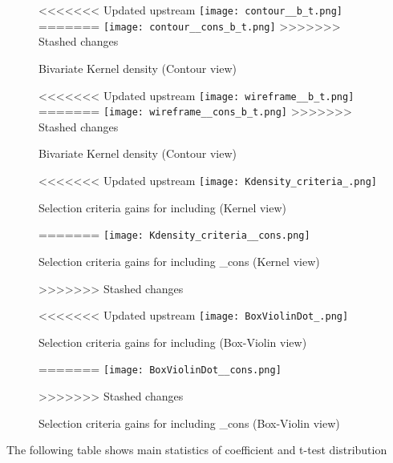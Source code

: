 \documentclass{article}
\begin{document}
\begin{figure}[!ht]
  \centering
  \begin{minipage}[b]{0.46\textwidth}
    \centering
<<<<<<< Updated upstream
    \texttt{[image: contour\_\_b\_t.png]}
=======
    \texttt{[image: contour\_\_cons\_b\_t.png]}
>>>>>>> Stashed changes
    \caption{Bivariate Kernel density (Contour view)}
  \end{minipage}
  \hfill
  \begin{minipage}[b]{0.53\textwidth}
    \centering
<<<<<<< Updated upstream
    \texttt{[image: wireframe\_\_b\_t.png]}
=======
    \texttt{[image: wireframe\_\_cons\_b\_t.png]}
>>>>>>> Stashed changes
    \caption{Bivariate Kernel density (Contour view)}
  \end{minipage}

  \begin{minipage}[b]{0.48\textwidth}
    \centering
<<<<<<< Updated upstream
    \texttt{[image: Kdensity\_criteria\_.png]}
    \caption{Selection criteria gains for including  (Kernel view)}
=======
    \texttt{[image: Kdensity\_criteria\_\_cons.png]}
    \caption{Selection criteria gains for including _cons (Kernel view)}
>>>>>>> Stashed changes
  \end{minipage}
  \hfill
  \begin{minipage}[b]{0.48\textwidth}
    \centering    
<<<<<<< Updated upstream
    \texttt{[image: BoxViolinDot\_.png]}
    \caption{Selection criteria gains for including  (Box-Violin view)}    
=======
    \texttt{[image: BoxViolinDot\_\_cons.png]}
    \caption{Selection criteria gains for including _cons (Box-Violin view)}    
>>>>>>> Stashed changes
  \end{minipage}
\end{figure}

\vspace{1cm}

The following table shows main statistics of coefficient and t-test distribution 
\end{document}
